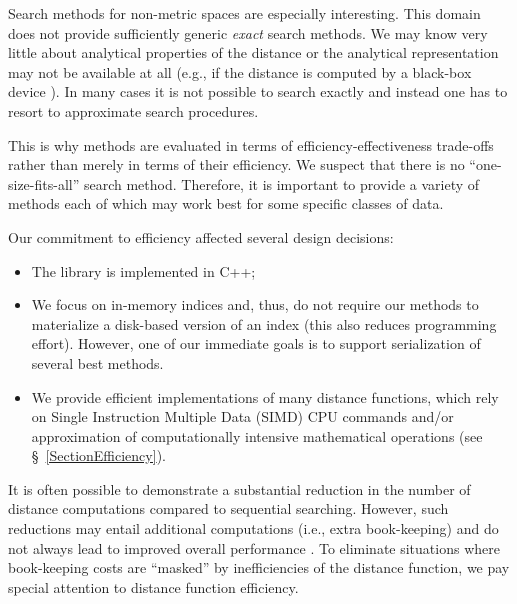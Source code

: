 \documentclass[runningheads,a4paper]{llncs}
\begin{document}
{Search methods for non-metric spaces are especially interesting.
This domain does not provide sufficiently generic \emph{exact} search methods.
We may know very little about analytical properties of the distance
or the analytical representation may not be available at all (e.g., if the 
distance is computed by a black-box device \cite{Skopal:2007}).
In many cases it is not possible to search exactly
and instead one has to resort to approximate search procedures.

This is why methods
are evaluated in terms of efficiency-effectiveness trade-offs
rather than merely in terms of their efficiency.
We suspect that there is no ``one-size-fits-all'' search method.
Therefore, it is important to provide a variety of methods
each of which may work best for some specific classes of data.

Our commitment to efficiency affected several design decisions:
\begin{itemize}
\item The library is implemented in C++;
\item We focus on in-memory indices 
and, thus, do not require our methods to materialize a disk-based version of an index
(this also reduces programming effort).
However, one of our immediate goals is to support serialization of several best methods.

\item 
We provide efficient implementations of many distance functions,
which rely on Single Instruction Multiple Data (SIMD) CPU commands  and/or
approximation of computationally intensive mathematical operations (see \S~\ref{SectionEfficiency}). 
\end{itemize}

It is often possible to demonstrate a substantial reduction in the number of distance computations
compared to sequential searching.
However, such reductions may entail additional computations (i.e., extra book-keeping)
and do not always lead to improved overall performance \cite{Boytsov_and_Bilegsaikhan:sisap2013}.
To eliminate situations where book-keeping costs are ``masked''
by inefficiencies of the distance function,
we pay special attention to distance function efficiency.

}
\end{document}
